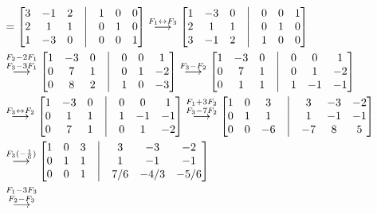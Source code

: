 \begin{enumerate}[topsep=6pt,itemsep=.4cm]
\begin{align*}
    [A|\operatornamewithlimits{Id}] &= 
    \begin{bmatrix}3 & -1 & 2&\bigm| &1 &0 & 0\\2 & 1 & 1&\bigm|& 0 &1 &0 \\1&-3&0&\bigm| &0 &0 &1\end{bmatrix}
    \stackrel{F_1 \leftrightarrow F_3}{\longrightarrow}
    \begin{bmatrix}1&-3&0&\bigm| &0 &0 &1\\2 & 1 & 1&\bigm|& 0 &1 &0 \\3 & -1 & 2&\bigm| &1 &0 & 0\end{bmatrix} \\
    &\stackrel{F_2 - 2 F_1}{\stackrel{F_3 - 3 F_1}{\longrightarrow}}
    \begin{bmatrix} 1 & -3 & 0  &\bigm|&0 &0 &1\\ 0 & 7 & 1 &\bigm|& 0 &1 &-2 \\ 0 & 8 & 2 &\bigm| &1 &0 & -3\end{bmatrix}
    \stackrel{F_3-F_2}{\longrightarrow}
    \begin{bmatrix} 1 & -3 & 0  &\bigm|&0 &0 &1\\ 0 & 7 & 1 &\bigm|& 0 &1 &-2 \\  0 & 1 & 1  &\bigm| &1 &-1 & -1\end{bmatrix}\\
    &\stackrel{F_3 \leftrightarrow F_2}{\longrightarrow} 
    \begin{bmatrix} 1 & -3 & 0  &\bigm|&0 &0 &1\\  0 & 1 & 1  &\bigm| &1 &-1 & -1\\ 0 & 7 & 1 &\bigm|& 0 &1 &-2 \end{bmatrix}
    \stackrel{F_1 + 3 F_2}{\stackrel{F_3-7F_2}{\longrightarrow}}
    \begin{bmatrix} 1 & 0 & 3 &\bigm|&3 & -3 &-2\\ 0 & 1 & 1 &\bigm| &1 &-1 & -1\\ 0 & 0 & -6 &\bigm|&-7&8&5\end{bmatrix} \\
    &\stackrel{F_3 (-\frac{1}{6}) }{\longrightarrow}
    \begin{bmatrix} 1 & 0 & 3 &\bigm|&3 & -3 &-2\\ 0 & 1 & 1 &\bigm| &1 &-1 & -1\\ 0 & 0 & 1 &\bigm|&7/6&-4/3&-5/6\end{bmatrix} \\
    &\stackrel{F_1 - 3 F_3}{\stackrel{F_2 - F_3 }{\longrightarrow}}

\end{align*}
\end{enumerate}

